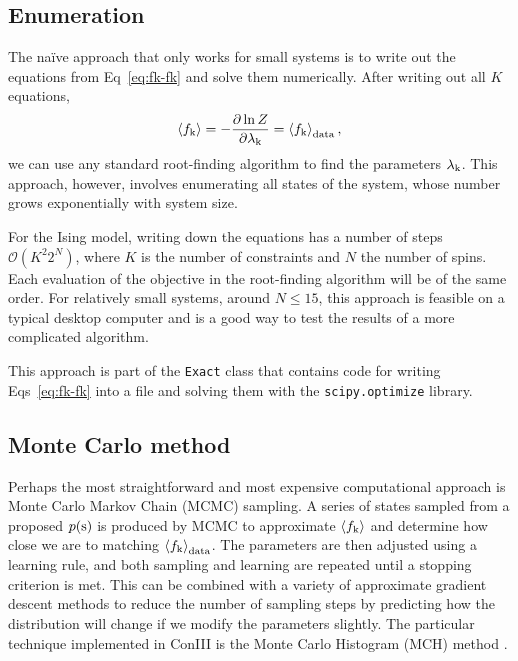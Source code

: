 \documentclass[aps,prl,twocolumn,nofootinbib]{revtex4-1}
\begin{document}
\subsection{Enumeration}
The na\"{i}ve approach that only works for small systems is to write out the equations from Eq~\ref{eq:fk-fk} and solve them numerically. After writing out all $K$ equations,
\begin{equation}
	\left<f_{\rm k}\right> = -\frac{\partial \ln Z}{\partial \lambda_{\rm k}} = \left<f_{\rm k}\right>_{\rm data} \\,
\end{equation}
we can use any standard root-finding algorithm to find the parameters $\lambda_{\rm k}$.
This approach, however, involves enumerating all states of the system, whose number grows exponentially with system size.

For the Ising model, writing down the equations has a number of steps $\mathcal{O}(K^2 2^{N})$, where $K$ is the number of constraints and $N$ the number of spins.  Each evaluation of the objective in the root-finding algorithm will be of the same order. For relatively small systems, around $N\leq15$, this approach is feasible on a typical desktop computer and is a good way to test the results of a more complicated algorithm.

This approach is part of the {\tt Exact} class that contains code for writing Eqs~\ref{eq:fk-fk} into a file and solving them with the {\tt scipy.optimize} library.


\subsection{Monte Carlo method}
Perhaps the most straightforward and most expensive computational approach is Monte Carlo Markov Chain (MCMC) sampling.  A series of states sampled from a proposed $p({\rm s})$ is produced by MCMC to approximate $\left<f_{\rm k}\right>$ and determine how close we are to matching $\left<f_{\rm k}\right>_{\rm data}$.  The parameters are then adjusted using a learning rule, and both sampling and learning are repeated until a stopping criterion is met.
This can be combined with a variety of approximate gradient descent methods to reduce the number of sampling steps by predicting how the distribution will change if we modify the parameters slightly.
The particular technique implemented in ConIII is the Monte Carlo Histogram (MCH) method \cite{Broderick:2007wq}.
\end{document}
